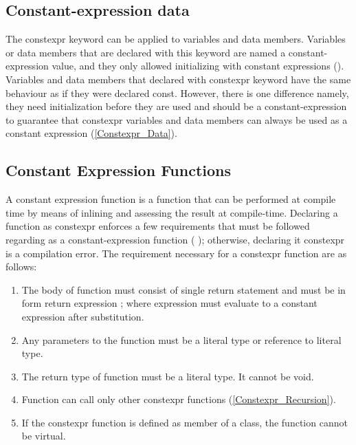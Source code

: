 \documentclass[11pt]{report}
\begin{document}
\subsection{Constant-expression data}
\label{subsection: constant-expression data}
The constexpr keyword can be applied to variables and data members.  Variables or data members that are declared with this keyword are named a constant-expression value, and they only allowed initializing with constant expressions (\cite{Williams:2012:CCA}). Variables and data members that declared with constexpr keyword have the same behaviour as if they were declared const. However, there is one difference namely, they need initialization before they are used and should be a constant-expression to guarantee that constexpr variables and data members can always be used as a constant expression (\ref{Constexpr_Data}). 

\subsection{Constant Expression Functions}
\label{Constant Expression Functions}
A constant expression function is a function that can be performed at compile time by means of inlining and assessing the result at compile-time. Declaring a function as constexpr enforces a few requirements that must be followed regarding as a constant-expression function ( \cite{Gregorie:professionalcpp}); otherwise, declaring it constexpr is a compilation error. The requirement necessary for a constexpr function are as follows:

\begin{enumerate}
\item The body of function must consist of single return statement and must be in form {return expression ;} where expression must evaluate to a constant expression after substitution.

\item Any parameters to the function must be a literal type or reference to literal type.

\item The return type of function must be a literal type. It cannot be void.

\item Function can call only other constexpr functions (\ref{Constexpr_Recursion}).

\item If the constexpr function is defined as member of a class, the function cannot be virtual.
\end{enumerate}
\end{document}
